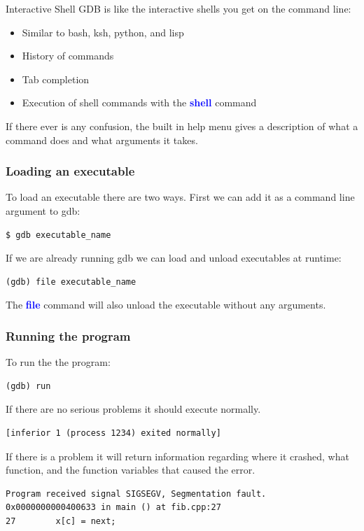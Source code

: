 \documentclass[11pt]{beamer}
\begin{document}
\begin{frame}{Interactive Shell}
        GDB is like the interactive shells you get on the command line:
\begin{itemize}
\item Similar to bash, ksh, python, and lisp
\item History of commands
\item Tab completion
\item Execution of shell commands with the \textbf{\textcolor{blue}{shell}} command
\end{itemize}
If there ever is any confusion, the built in help menu gives a description of what a command does and what arguments it takes.
\end{frame}

\begin{frame}[fragile]
\frametitle{Loading an executable}
To load an executable there are two ways. First we can add it as a command line argument to gdb:
\begin{lstlisting}[style=BashInputStyle]
$ gdb executable_name
\end{lstlisting}
If we are already running gdb we can load and unload executables at runtime:
\begin{lstlisting}[style=BashInputStyle]
(gdb) file executable_name
\end{lstlisting}
The \textbf{\textcolor{blue}{file}} command will also unload the executable without any arguments.
\end{frame}

\begin{frame}[fragile]
\frametitle{Running the program}
To run the the program:
\begin{lstlisting}[style=BashInputStyle]
(gdb) run
\end{lstlisting}
If there are no serious problems it should execute normally.
\begin{lstlisting}[style=BashInputStyle]
[inferior 1 (process 1234) exited normally]
\end{lstlisting}
If there is a problem it will return information regarding where it crashed, what function, and the function variables that caused the error.
\begin{lstlisting}[style=BashInputStyle]
Program received signal SIGSEGV, Segmentation fault.
0x0000000000400633 in main () at fib.cpp:27
27        x[c] = next;
\end{lstlisting}
\end{frame}
\end{document}
